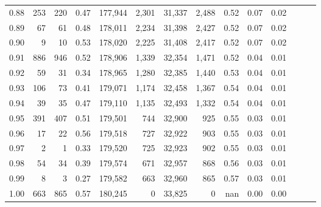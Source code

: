 \begin{tabular}{rrrrrrrrrrrrrr}
0.88 &     253 &    220 &  0.47 &  177,944 &    2,301 &  31,337 &   2,488 &  0.52 &  0.07 &      0.02 \\
0.89 &      67 &     61 &  0.48 &  178,011 &    2,234 &  31,398 &   2,427 &  0.52 &  0.07 &      0.02 \\
0.90 &       9 &     10 &  0.53 &  178,020 &    2,225 &  31,408 &   2,417 &  0.52 &  0.07 &      0.02 \\
0.91 &     886 &    946 &  0.52 &  178,906 &    1,339 &  32,354 &   1,471 &  0.52 &  0.04 &      0.01 \\
0.92 &      59 &     31 &  0.34 &  178,965 &    1,280 &  32,385 &   1,440 &  0.53 &  0.04 &      0.01 \\
0.93 &     106 &     73 &  0.41 &  179,071 &    1,174 &  32,458 &   1,367 &  0.54 &  0.04 &      0.01 \\
0.94 &      39 &     35 &  0.47 &  179,110 &    1,135 &  32,493 &   1,332 &  0.54 &  0.04 &      0.01 \\
0.95 &     391 &    407 &  0.51 &  179,501 &      744 &  32,900 &     925 &  0.55 &  0.03 &      0.01 \\
0.96 &      17 &     22 &  0.56 &  179,518 &      727 &  32,922 &     903 &  0.55 &  0.03 &      0.01 \\
0.97 &       2 &      1 &  0.33 &  179,520 &      725 &  32,923 &     902 &  0.55 &  0.03 &      0.01 \\
0.98 &      54 &     34 &  0.39 &  179,574 &      671 &  32,957 &     868 &  0.56 &  0.03 &      0.01 \\
0.99 &       8 &      3 &  0.27 &  179,582 &      663 &  32,960 &     865 &  0.57 &  0.03 &      0.01 \\
1.00 &     663 &    865 &  0.57 &  180,245 &        0 &  33,825 &       0 &   nan &  0.00 &      0.00 \\
\bottomrule
\end{tabular}
